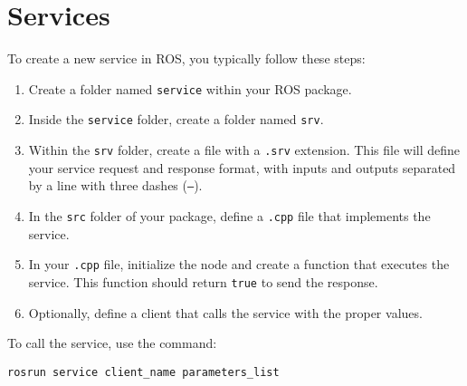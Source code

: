 \section{Services}

To create a new service in ROS, you typically follow these steps:
\begin{enumerate}
    \item Create a folder named \texttt{service} within your ROS package.
    \item Inside the \texttt{service} folder, create a folder named \texttt{srv}.
    \item Within the \texttt{srv} folder, create a file with a \texttt{.srv} extension. 
        This file will define your service request and response format, with inputs and outputs separated by a line with three dashes (\texttt{---}).
    \item In the \texttt{src} folder of your package, define a \texttt{.cpp} file that implements the service.
    \item In your \texttt{.cpp} file, initialize the node and create a function that executes the service. This function should return \texttt{true} to send the response.
    \item Optionally, define a client that calls the service with the proper values.
\end{enumerate}

To call the service, use the command:
\begin{verbatim}
rosrun service client_name parameters_list
\end{verbatim}